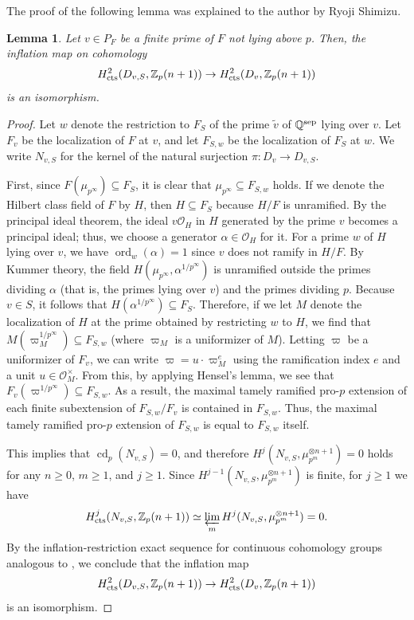 \documentclass{article}
\numberwithin{equation}{section} %
\newtheorem{lemm}{Lemma}[section]
\begin{document}
The proof of the following lemma was explained to the author by Ryoji Shimizu.

\begin{lemm}
    \label{drghiown4ogtmeo4mo}
  Let $v \in P_{F}$ be a finite prime of $F$ not lying above $p$. Then, the inflation map on cohomology
  \[
    H^2_{\rm cts}(D_{v,S},\mathbb{Z}_p(n+1)) \to H^2_{\rm cts}(D_v,\mathbb{Z}_p(n+1))
  \]
  is an isomorphism.
\end{lemm}

\begin{proof}
  Let $w$ denote the restriction to $F_S$ of the prime $\widetilde{v}$ of $\mathbb{Q}^{\rm sep}$ lying over $v$. Let $F_v$ be the localization of $F$ at $v$, and let $F_{S,w}$ be the localization of $F_S$ at $w$. We write $N_{v,S}$ for the kernel of the natural surjection $\pi: D_v \to D_{v,S}$.
  
  First, since $F(\mu_{p^\infty}) \subseteq F_S$, it is clear that $\mu_{p^\infty} \subseteq F_{S,w}$ holds. If we denote the Hilbert class field of $F$ by $H$, then $H \subseteq F_S$ because $H/F$ is unramified. By the principal ideal theorem, the ideal $v\mathcal{O}_H$ in $H$ generated by the prime $v$ becomes a principal ideal; thus, we choose a generator $\alpha \in \mathcal{O}_H$ for it. For a prime $w$ of $H$ lying over $v$, we have $\operatorname{ord}_w(\alpha) = 1$ since $v$ does not ramify in $H/F$. By Kummer theory, the field $H(\mu_{p^\infty},\alpha^{1/p^\infty})$ is unramified outside the primes dividing $\alpha$ (that is, the primes lying over $v$) and the primes dividing $p$. Because $v \in S$, it follows that $H(\alpha^{1/p^\infty}) \subseteq F_S$. Therefore, if we let $M$ denote the localization of $H$ at the prime obtained by restricting $w$ to $H$, we find that $M(\varpi^{1/p^\infty}_M) \subseteq F_{S,w}$ (where $\varpi_M$ is a uniformizer of $M$). Letting $\varpi$ be a uniformizer of $F_v$, we can write $\varpi = u\cdot \varpi_M^e$ using the ramification index $e$ and a unit $u \in \mathcal{O}_M^\times$. From this, by applying Hensel's lemma, we see that $F_v(\varpi^{1/p^\infty}) \subseteq F_{S,w}$. As a result, the maximal tamely ramified pro-$p$ extension of each finite subextension of $F_{S,w}/F_v$ is contained in $F_{S,w}$. Thus, the maximal tamely ramified pro-$p$ extension of $F_{S,w}$ is equal to $F_{S,w}$ itself.

  This implies that $\operatorname{cd}_p(N_{v,S}) = 0$, and therefore $H^j(N_{v,S},\mu_{p^m}^{\otimes n+1}) = 0$ holds for any $n \geq 0$, $m \geq 1$, and $j \geq 1$. Since $H^{j-1}(N_{v,S},\mu_{p^m}^{\otimes n+1})$ is finite, for $j \geq 1$ we have
  \[
    H^j_{\rm cts}(N_{v,S},\mathbb{Z}_p(n+1)) \simeq \varprojlim_m H^j(N_{v,S},\mu_{p^m}^{\otimes n+1}) = 0.
  \]
  By the inflation-restriction exact sequence for continuous cohomology groups analogous to \cite[Proposition (1.6.7)]{NSW}, we conclude that the inflation map
  \[
    H^2_{\rm cts}(D_{v,S},\mathbb{Z}_p(n+1)) \to H^2_{\rm cts}(D_v,\mathbb{Z}_p(n+1))
  \]
  is an isomorphism.
\end{proof}
\end{document}
